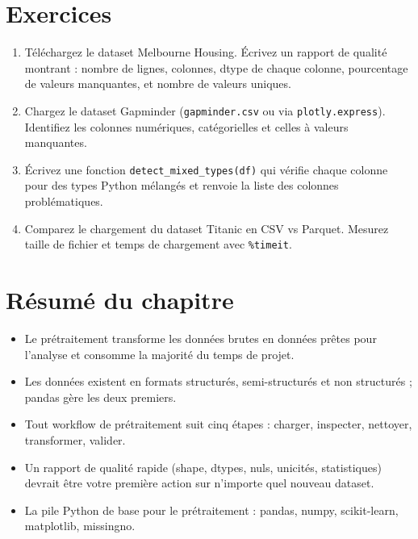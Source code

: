\section{Exercices}

\begin{exercise}
\begin{enumerate}
  \item T\'el\'echargez le dataset Melbourne Housing. \'Ecrivez un rapport de qualit\'e montrant : nombre de lignes, colonnes, dtype de chaque colonne, pourcentage de valeurs manquantes, et nombre de valeurs uniques.
  \item Chargez le dataset Gapminder (\texttt{gapminder.csv} ou via \texttt{plotly.express}). Identifiez les colonnes num\'eriques, cat\'egorielles et celles \`a valeurs manquantes.
  \item \'Ecrivez une fonction \texttt{detect\_mixed\_types(df)} qui v\'erifie chaque colonne pour des types Python m\'elang\'es et renvoie la liste des colonnes probl\'ematiques.
  \item Comparez le chargement du dataset Titanic en CSV vs Parquet. Mesurez taille de fichier et temps de chargement avec \texttt{\%timeit}.
\end{enumerate}
\end{exercise}

\section{R\'esum\'e du chapitre}

\begin{itemize}
  \item Le pr\'etraitement transforme les donn\'ees brutes en donn\'ees pr\^etes pour l'analyse et consomme la majorit\'e du temps de projet.
  \item Les donn\'ees existent en formats structur\'es, semi-structur\'es et non structur\'es ; pandas g\`ere les deux premiers.
  \item Tout workflow de pr\'etraitement suit cinq \'etapes : charger, inspecter, nettoyer, transformer, valider.
  \item Un rapport de qualit\'e rapide (shape, dtypes, nuls, unicit\'es, statistiques) devrait \^etre votre premi\`ere action sur n'importe quel nouveau dataset.
  \item La pile Python de base pour le pr\'etraitement : pandas, numpy, scikit-learn, matplotlib, missingno.
\end{itemize}
